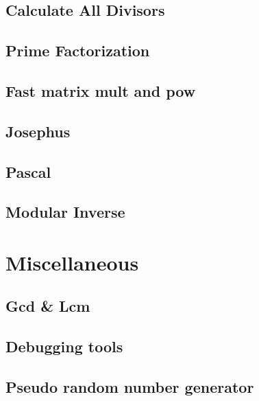 \subsection{Calculate All Divisors}
\raggedbottom
\hrulefill
\subsection{Prime Factorization}
\raggedbottom
\hrulefill
\subsection{Fast matrix mult and pow}
\raggedbottom
\hrulefill
\subsection{Josephus}
\raggedbottom
\hrulefill
\subsection{Pascal}
\raggedbottom
\hrulefill
\subsection{Modular Inverse}
\raggedbottom
\hrulefill
\section{Miscellaneous}
\subsection{Gcd \& Lcm}
\raggedbottom
\hrulefill
\subsection{Debugging tools}
\raggedbottom
\hrulefill
\subsection{Pseudo random number generator}
\raggedbottom
\hrulefill
